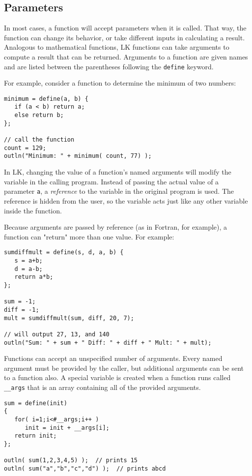 \documentclass{article}
\begin{document}
\subsection{Parameters}

In most cases, a function will accept parameters when it is called.  That way, the function can change its behavior, or take different inputs in calculating a result.  Analogous to mathematical functions, LK functions can take arguments to compute a result that can be returned.  Arguments to a function are given names and are listed between the parentheses following the \texttt{define} keyword.  

For example, consider a function to determine the minimum of two numbers:

\begin{verbatim}
minimum = define(a, b) {
   if (a < b) return a;
   else return b;
};

// call the function
count = 129;
outln("Minimum: " + minimum( count, 77) );
\end{verbatim}

In LK, changing the value of a function's named arguments will modify the variable in the calling program.  Instead of passing the actual value of a parameter \texttt{a}, a \emph{reference} to the variable in the original program is used.  The reference is hidden from the user, so the variable acts just like any other variable inside the function.  

Because arguments are passed by reference (as in Fortran, for example), a function can "return" more than one value.  For example:

\begin{verbatim}
sumdiffmult = define(s, d, a, b) {
   s = a+b;
   d = a-b;
   return a*b;
};

sum = -1;
diff = -1;
mult = sumdiffmult(sum, diff, 20, 7);

// will output 27, 13, and 140
outln("Sum: " + sum + " Diff: " + diff + " Mult: " + mult);
\end{verbatim}

Functions can accept an unspecified number of arguments.  Every named argument must be provided by the caller, but additional arguments can be sent to a function also.  A special variable is created when a function runs called \texttt{\_\_args} that is an array containing all of the provided arguments.

\begin{verbatim}
sum = define(init)
{
   for( i=1;i<#__args;i++ )
      init = init + __args[i];
   return init;
};

outln( sum(1,2,3,4,5) );  // prints 15
outln( sum("a","b","c","d") );  // prints abcd
\end{verbatim}
\end{document}
